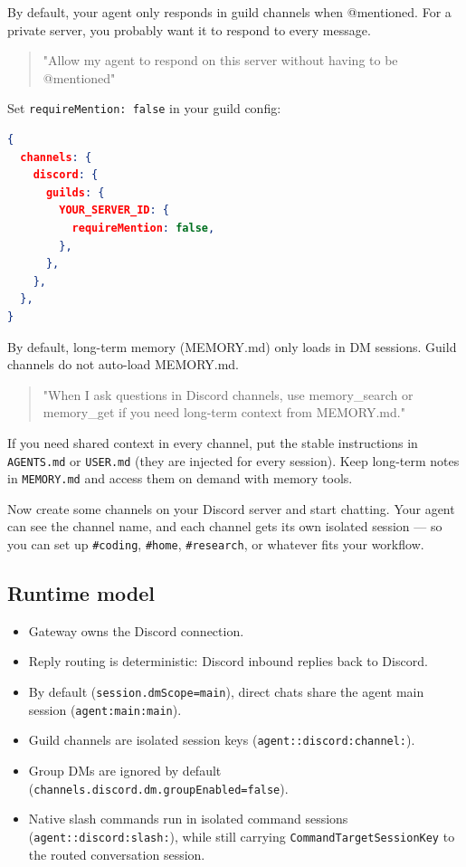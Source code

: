 By default, your agent only responds in guild channels when @mentioned. For a private server, you probably want it to respond to every message.

\begin{quote}
"Allow my agent to respond on this server without having to be @mentioned"
\end{quote}

Set \texttt{requireMention: false} in your guild config:

\begin{lstlisting}[language=json]
{
  channels: {
    discord: {
      guilds: {
        YOUR_SERVER_ID: {
          requireMention: false,
        },
      },
    },
  },
}
\end{lstlisting}




By default, long-term memory (MEMORY.md) only loads in DM sessions. Guild channels do not auto-load MEMORY.md.

\begin{quote}
"When I ask questions in Discord channels, use memory\_search or memory\_get if you need long-term context from MEMORY.md."
\end{quote}

If you need shared context in every channel, put the stable instructions in \texttt{AGENTS.md} or \texttt{USER.md} (they are injected for every session). Keep long-term notes in \texttt{MEMORY.md} and access them on demand with memory tools.


Now create some channels on your Discord server and start chatting. Your agent can see the channel name, and each channel gets its own isolated session — so you can set up \texttt{\#coding}, \texttt{\#home}, \texttt{\#research}, or whatever fits your workflow.

\subsection{Runtime model}


\begin{itemize}
  \item Gateway owns the Discord connection.
  \item Reply routing is deterministic: Discord inbound replies back to Discord.
  \item By default (\texttt{session.dmScope=main}), direct chats share the agent main session (\texttt{agent:main:main}).
  \item Guild channels are isolated session keys (\texttt{agent::discord:channel:}).
  \item Group DMs are ignored by default (\texttt{channels.discord.dm.groupEnabled=false}).
  \item Native slash commands run in isolated command sessions (\texttt{agent::discord:slash:}), while still carrying \texttt{CommandTargetSessionKey} to the routed conversation session.
\end{itemize}


